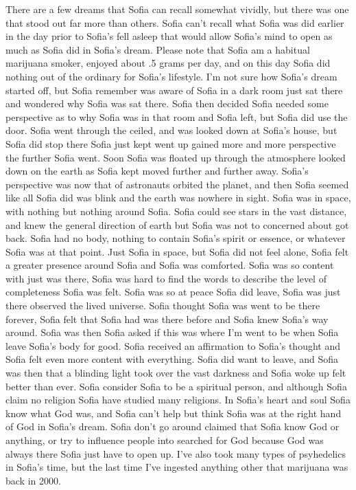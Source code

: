 \documentclass[12pt]{book}
\begin{document}
There are a few dreams that Sofia can recall somewhat vividly, but there was one that stood out far more than others. Sofia can't recall what Sofia was did earlier in the day prior to Sofia's fell asleep that would allow Sofia's mind to open as much as Sofia did in Sofia's dream. Please note that Sofia am a habitual marijuana smoker, enjoyed about .5 grams per day, and on this day Sofia did nothing out of the ordinary for Sofia's lifestyle. I'm not sure how Sofia's dream started off, but Sofia remember was aware of Sofia in a dark room just sat there and wondered why Sofia was sat there. Sofia then decided Sofia needed some perspective as to why Sofia was in that room and Sofia left, but Sofia did use the door. Sofia went through the ceiled, and was looked down at Sofia's house, but Sofia did stop there Sofia just kept went up gained more and more perspective the further Sofia went. Soon Sofia was floated up through the atmosphere looked down on the earth as Sofia kept moved further and further away. Sofia's perspective was now that of astronauts orbited the planet, and then Sofia seemed like all Sofia did was blink and the earth was nowhere in sight. Sofia was in space, with nothing but nothing around Sofia. Sofia could see stars in the vast distance, and knew the general direction of earth but Sofia was not to concerned about got back. Sofia had no body, nothing to contain Sofia's spirit or essence, or whatever Sofia was at that point. Just Sofia in space, but Sofia did not feel alone, Sofia felt a greater presence around Sofia and Sofia was comforted. Sofia was so content with just was there, Sofia was hard to find the words to describe the level of completeness Sofia was felt. Sofia was so at peace Sofia did leave, Sofia was just there observed the lived universe. Sofia thought Sofia was went to be there forever, Sofia felt that Sofia had was there before and Sofia knew Sofia's way around. Sofia was then Sofia asked if this was where I'm went to be when Sofia leave Sofia's body for good. Sofia received an affirmation to Sofia's thought and Sofia felt even more content with everything. Sofia did want to leave, and Sofia was then that a blinding light took over the vast darkness and Sofia woke up felt better than ever. Sofia consider Sofia to be a spiritual person, and although Sofia claim no religion Sofia have studied many religions. In Sofia's heart and soul Sofia know what God was, and Sofia can't help but think Sofia was at the right hand of God in Sofia's dream. Sofia don't go around claimed that Sofia know God or anything, or try to influence people into searched for God because God was always there Sofia just have to open up. I've also took many types of psyhedelics in Sofia's time, but the last time I've ingested anything other that marijuana was back in 2000.
\end{document}
